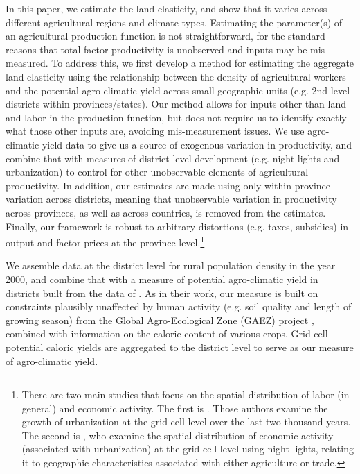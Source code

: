 \documentclass[11pt]{article}
\begin{document}
In this paper, we estimate the land elasticity, and show that it varies across different agricultural regions and climate types. Estimating the parameter(s) of an agricultural production function is not straightforward, for the standard reasons that total factor productivity is unobserved and inputs may be mis-measured. To address this, we first develop a method for estimating the aggregate land elasticity using the relationship between the density of agricultural workers and the potential agro-climatic yield across small geographic units (e.g. 2nd-level districts within provinces/states). Our method allows for inputs other than land and labor in the production function, but does not require us to identify exactly what those other inputs are, avoiding mis-measurement issues. We use agro-climatic yield data to give us a source of exogenous variation in productivity, and combine that with measures of district-level development (e.g. night lights and urbanization) to control for other unobservable elements of agricultural productivity. In addition, our estimates are made using only within-province variation across districts, meaning that unobservable variation in productivity across provinces, as well as across countries, is removed from the estimates. Finally, our framework is robust to arbitrary distortions (e.g. taxes, subsidies) in output and factor prices at the province level.\footnote{There are two main studies that focus on the spatial distribution of labor (in general) and economic activity. The first is \citet{mfm2014}. Those authors examine the growth of urbanization at the grid-cell level over the last two-thousand years. The second is \citet{hssw2016}, who examine the spatial distribution of economic activity (associated with urbanization) at the grid-cell level using night lights, relating it to geographic characteristics associated with either agriculture or trade.} 

We assemble data at the district level for rural population density in the year 2000, and combine that with a measure of potential agro-climatic yield in districts built from the data of \citet{galorozak2016}. As in their work, our measure is built on constraints plausibly unaffected by human activity (e.g. soil quality and length of growing season) from the Global Agro-Ecological Zone (GAEZ) project \citep{gaez}, combined with information on the calorie content of various crops. Grid cell potential caloric yields are aggregated to the district level to serve as our measure of agro-climatic yield.
\end{document}
